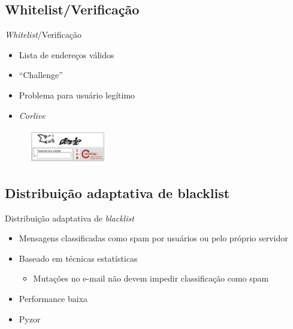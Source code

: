 \documentclass[dvipdfm]{beamer}
\begin{document}
\subsection{Whitelist/Verificação} 
\begin{frame}{\emph{Whitelist}/Verificação}
	\begin{itemize}
		\item Lista de endereços válidos
		\item ``Challenge''
		\item Problema para usuário legítimo
		\item \emph{Corlive}
	\end{itemize}
	\begin{figure}
		\centering
		\includegraphics[height=1.5cm]{Imagens/random/recaptcha.jpg}
	\end{figure}
\end{frame}

\subsection{Distribuição adaptativa de blacklist}
\begin{frame}{Distribuição adaptativa de \emph{blacklist}}
	\begin{itemize}
		\item Mensagens classificadas como spam por usuários ou pelo próprio servidor
		\item Baseado em técnicas estatísticas
		\begin{itemize}
			\item Mutações no e-mail não devem impedir classificação como spam
		\end{itemize}
		\item Performance baixa
		\item Pyzor
	\end{itemize}
\end{frame}
\end{document}
